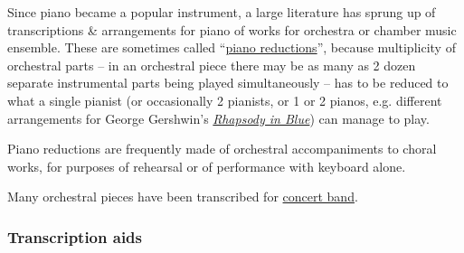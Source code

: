 \documentclass{article}
\begin{document}
Since piano became a popular instrument, a large literature has sprung up of transcriptions \& arrangements for piano of works for orchestra or chamber music ensemble. These are sometimes called ``\href{https://en.wikipedia.org/wiki/Reduction_(music)}{piano reductions}'', because multiplicity of orchestral parts -- in an orchestral piece there may be as many as 2 dozen separate instrumental parts being played simultaneously -- has to be reduced to what a single pianist (or occasionally 2 pianists, or 1 or 2 pianos, e.g. different arrangements for {\sc George Gershwin}'s \href{https://en.wikipedia.org/wiki/Rhapsody_in_Blue}{\it Rhapsody in Blue}) can manage to play.

Piano reductions are frequently made of orchestral accompaniments to choral works, for purposes of rehearsal or of performance with keyboard alone.

Many orchestral pieces have been transcribed for \href{https://en.wikipedia.org/wiki/Concert_band}{concert band}.

\subsubsection{Transcription aids}
\end{document}
